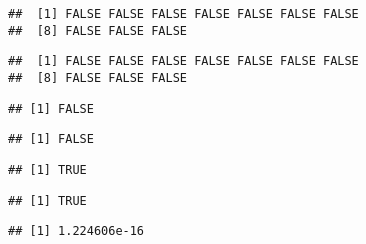 \documentclass[paper=a4,10pt,div=17,headsepline,BCOR=12mm,twoside,open=right]{scrbook}\usepackage{knitr}
\begin{document}
\begin{knitrout}\footnotesize
{}\color{fgcolor}\begin{kframe}
\begin{alltt}
 \hlopt{==}  
\end{alltt}
\begin{verbatim}
##  [1] FALSE FALSE FALSE FALSE FALSE FALSE FALSE
##  [8] FALSE FALSE FALSE
\end{verbatim}
\begin{alltt}
 \hlopt{<}  
\end{alltt}
\begin{verbatim}
##  [1] FALSE FALSE FALSE FALSE FALSE FALSE FALSE
##  [8] FALSE FALSE FALSE
\end{verbatim}
\begin{alltt}
 \hlopt{==}  
\end{alltt}
\begin{verbatim}
## [1] FALSE
\end{verbatim}
\begin{alltt}
\hlstd{(} \hlopt{*}  \hlopt{==} 
\end{alltt}
\begin{verbatim}
## [1] FALSE
\end{verbatim}
\begin{alltt}
\hlstd{(} \hlopt{<} 
\end{alltt}
\begin{verbatim}
## [1] TRUE
\end{verbatim}
\begin{alltt}
\hlstd{(}\hlstd{(} \hlopt{*}  \hlopt{<} 
\end{alltt}
\begin{verbatim}
## [1] TRUE
\end{verbatim}
\begin{alltt}
\end{alltt}
\begin{verbatim}
## [1] 1.224606e-16
\end{verbatim}
\begin{alltt}
\hlstd{(} \hlopt{*} 
\end{alltt}
\begin{verbatim}

\end{verbatim}
\end{kframe}
\end{knitrout}
\end{document}
